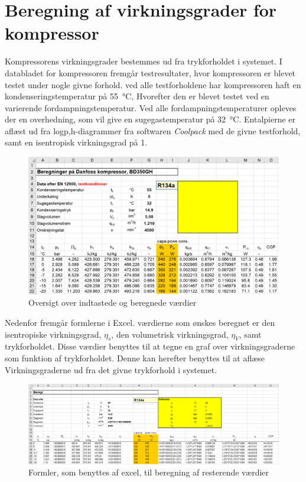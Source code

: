 \documentclass[Hovedrapport.tex]{subfiles}
\begin{document}
\section{Beregning af virkningsgrader for kompressor}
    \label{sec:apndx_kompressor_virkningsgrad}
Kompressorens virkningsgrader bestemmes ud fra trykforholdet i systemet. I databladet for kompressoren fremgår testresultater, hvor kompressoren er blevet testet under nogle givne forhold. ved alle testforholdene har kompressoren haft en kondenseringstemperatur på \SI{55}{\celsius}, Hvorefter den er blevet testet ved en varierende fordampningstemperatur. Ved alle fordampningstemperaturer opleves der en overhedning, som vil give en sugegastemperatur på \SI{32}{\celsius}. Entalpierne er aflæst ud fra logp,h-diagrammer fra softwaren \textit{Coolpack} med de givne testforhold, samt en isentropisk virkningsgrad på 1. 
\begin{figure}[H]
    \centering
    \includegraphics[width=1.0\textwidth]{Billeder/kompressor_excel_1}
    \caption{Oversigt over indtastede og beregnede værdier}
    \label{fig:kompressor_excel_1}
\end{figure}
Nedenfor fremgår formlerne i Excel. værdierne som ønskes beregnet er den isentropiske virkningsgrad, $\eta_s$, den volumetrisk virkningsgrad, $\eta_V$, samt trykforholdet. Disse værdier benyttes til at tegne en graf over virkningsgraderne som funktion af trykforholdet. Denne kan herefter benyttes til at aflæse Virkningsgraderne ud fra det givne trykforhold i systemet.
\begin{figure}[H]
    \centering
    \includegraphics[width=1.0\textwidth]{Billeder/kompressor_excel_4}
    \caption{Formler, som benyttes af excel, til beregning af resterende værdier}
    \label{fig:kompressor_excel_4}
\end{figure}
\end{document}
